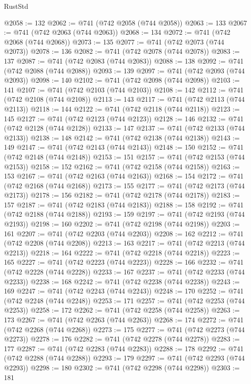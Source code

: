 \begin{lexlean}{RustStd}
\begin{coremodule}
@2058 := 132
@2062 := @741 (@742 @2058 (@744 @2058))
@2063 := 133
@2067 := @741 (@742 @2063 (@744 @2063))
@2068 := 134
@2072 := @741 (@742 @2068 (@744 @2068))
@2073 := 135
@2077 := @741 (@742 @2073 (@744 @2073))
@2078 := 136
@2082 := @741 (@742 @2078 (@744 @2078))
@2083 := 137
@2087 := @741 (@742 @2083 (@744 @2083))
@2088 := 138
@2092 := @741 (@742 @2088 (@744 @2088))
@2093 := 139
@2097 := @741 (@742 @2093 (@744 @2093))
@2098 := 140
@2102 := @741 (@742 @2098 (@744 @2098))
@2103 := 141
@2107 := @741 (@742 @2103 (@744 @2103))
@2108 := 142
@2112 := @741 (@742 @2108 (@744 @2108))
@2113 := 143
@2117 := @741 (@742 @2113 (@744 @2113))
@2118 := 144
@2122 := @741 (@742 @2118 (@744 @2118))
@2123 := 145
@2127 := @741 (@742 @2123 (@744 @2123))
@2128 := 146
@2132 := @741 (@742 @2128 (@744 @2128))
@2133 := 147
@2137 := @741 (@742 @2133 (@744 @2133))
@2138 := 148
@2142 := @741 (@742 @2138 (@744 @2138))
@2143 := 149
@2147 := @741 (@742 @2143 (@744 @2143))
@2148 := 150
@2152 := @741 (@742 @2148 (@744 @2148))
@2153 := 151
@2157 := @741 (@742 @2153 (@744 @2153))
@2158 := 152
@2162 := @741 (@742 @2158 (@744 @2158))
@2163 := 153
@2167 := @741 (@742 @2163 (@744 @2163))
@2168 := 154
@2172 := @741 (@742 @2168 (@744 @2168))
@2173 := 155
@2177 := @741 (@742 @2173 (@744 @2173))
@2178 := 156
@2182 := @741 (@742 @2178 (@744 @2178))
@2183 := 157
@2187 := @741 (@742 @2183 (@744 @2183))
@2188 := 158
@2192 := @741 (@742 @2188 (@744 @2188))
@2193 := 159
@2197 := @741 (@742 @2193 (@744 @2193))
@2198 := 160
@2202 := @741 (@742 @2198 (@744 @2198))
@2203 := 161
@2207 := @741 (@742 @2203 (@744 @2203))
@2208 := 162
@2212 := @741 (@742 @2208 (@744 @2208))
@2213 := 163
@2217 := @741 (@742 @2213 (@744 @2213))
@2218 := 164
@2222 := @741 (@742 @2218 (@744 @2218))
@2223 := 165
@2227 := @741 (@742 @2223 (@744 @2223))
@2228 := 166
@2232 := @741 (@742 @2228 (@744 @2228))
@2233 := 167
@2237 := @741 (@742 @2233 (@744 @2233))
@2238 := 168
@2242 := @741 (@742 @2238 (@744 @2238))
@2243 := 169
@2247 := @741 (@742 @2243 (@744 @2243))
@2248 := 170
@2252 := @741 (@742 @2248 (@744 @2248))
@2253 := 171
@2257 := @741 (@742 @2253 (@744 @2253))
@2258 := 172
@2262 := @741 (@742 @2258 (@744 @2258))
@2263 := 173
@2267 := @741 (@742 @2263 (@744 @2263))
@2268 := 174
@2272 := @741 (@742 @2268 (@744 @2268))
@2273 := 175
@2277 := @741 (@742 @2273 (@744 @2273))
@2278 := 176
@2282 := @741 (@742 @2278 (@744 @2278))
@2283 := 177
@2287 := @741 (@742 @2283 (@744 @2283))
@2288 := 178
@2292 := @741 (@742 @2288 (@744 @2288))
@2293 := 179
@2297 := @741 (@742 @2293 (@744 @2293))
@2298 := 180
@2302 := @741 (@742 @2298 (@744 @2298))
@2303 := 181

\end{coremodule}
\end{lexlean}
